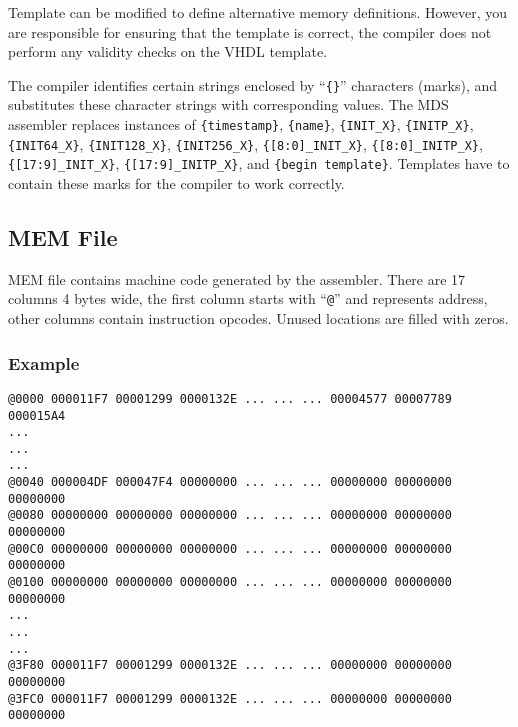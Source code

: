         Template can be modified to define alternative memory definitions. However, you are responsible for ensuring that the template is correct, the compiler does not perform any validity checks on the VHDL template.

        The compiler identifies certain strings enclosed by ``\texttt{\{\}}'' characters (marks), and substitutes these character strings with corresponding values. The MDS assembler replaces instances of \verb'{timestamp}', \verb'{name}', \verb'{INIT_X}', \verb'{INITP_X}', \verb'{INIT64_X}', \verb'{INIT128_X}', \verb'{INIT256_X}', \verb'{[8:0]_INIT_X}', \verb'{[8:0]_INITP_X}', \verb'{[17:9]_INIT_X}', \verb'{[17:9]_INITP_X}', and \verb'{begin template}'. Templates have to contain these marks for the compiler to work correctly.

    \subsection{MEM File}
        MEM file contains machine code generated by the assembler. There are 17 columns 4 bytes wide, the first column starts with ``\verb'@''' and represents address, other columns contain instruction opcodes. Unused locations are filled with zeros.

        \subsubsection{Example}
            \verb'@0000 000011F7 00001299 0000132E ... ... ... 00004577 00007789 000015A4'\\
            \verb'...'\\
            \verb'...'\\
            \verb'...'\\
            \verb'@0040 000004DF 000047F4 00000000 ... ... ... 00000000 00000000 00000000'\\
            \verb'@0080 00000000 00000000 00000000 ... ... ... 00000000 00000000 00000000'\\
            \verb'@00C0 00000000 00000000 00000000 ... ... ... 00000000 00000000 00000000'\\
            \verb'@0100 00000000 00000000 00000000 ... ... ... 00000000 00000000 00000000'\\
            \verb'...'\\
            \verb'...'\\
            \verb'...'\\
            \verb'@3F80 000011F7 00001299 0000132E ... ... ... 00000000 00000000 00000000'\\
            \verb'@3FC0 000011F7 00001299 0000132E ... ... ... 00000000 00000000 00000000'\\

